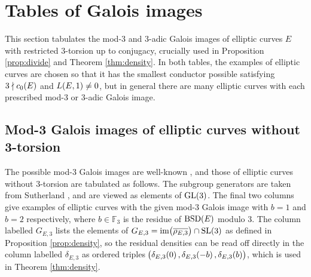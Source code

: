 \documentclass{article}
\theoremstyle{plain}
\theoremstyle{definition}
\newcommand{\BSD}{\operatorname{BSD}}
\newcommand{\FF}{\mathbb{F}}
\newcommand{\GL}{\operatorname{GL}}
\newcommand{\im}{\operatorname{im}}
\newcommand{\SL}{\operatorname{SL}}
\newcommand{\br}{\!\del}
\begin{document}
\pagebreak

\appendix

\section{Tables of Galois images}

\label{sec:table}

\def\arraystretch{1.5}

This section tabulates the mod-$ 3 $ and $ 3 $-adic Galois images of elliptic curves $ E $ with restricted $ 3 $-torsion up to conjugacy, crucially used in Proposition \ref{prop:divide} and Theorem \ref{thm:density}. In both tables, the examples of elliptic curves are chosen so that it has the smallest conductor possible satisfying $ 3 \nmid c_0\br{E} $ and $ L\br{E, 1} \ne 0 $, but in general there are many elliptic curves with each prescribed mod-$ 3 $ or $ 3 $-adic Galois image.

\subsection*{Mod-3 Galois images of elliptic curves without 3-torsion}

\def\arraystretch{1}

The possible mod-$ 3 $ Galois images are well-known \cite[Theorem 1.2, Proposition 1.14, and Proposition 1.16]{Zyw15}, and those of elliptic curves without $ 3 $-torsion are tabulated as follows. The subgroup generators are taken from Sutherland \cite[Section 6.4]{Sut16}, and are viewed as elements of $ \GL\br{3} $. The final two columns give examples of elliptic curves with the given mod-$ 3 $ Galois image with $ b = 1 $ and $ b = 2 $ respectively, where $ b \in \FF_3 $ is the residue of $ \BSD\br{E} $ modulo $ 3 $. The column labelled $ G_{E, 3} $ lists the elements of $ G_{E, 3} = \im\br{\overline{\rho_{E, 3}}} \cap \SL\br{3} $ as defined in Proposition \ref{prop:density}, so the residual densities can be read off directly in the column labelled $ \delta_{E, 3} $ as ordered triples $ \br{\delta_{E, 3}\br{0}, \delta_{E, 3}\br{-b}, \delta_{E, 3}\br{b}} $, which is used in Theorem \ref{thm:density}.


\vspace{-0.5cm}
\end{document}
